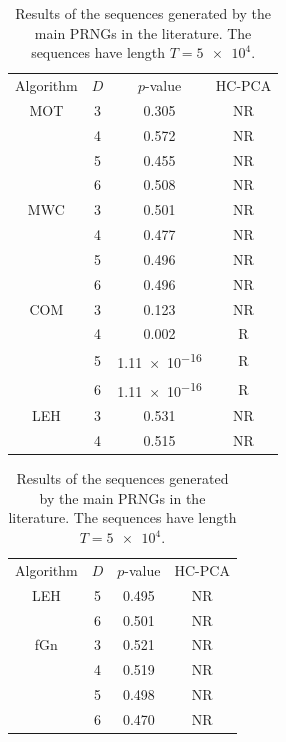 \documentclass[alpha-refs]{wiley-article}
\begin{document}
\begin{table}
	\caption{Results of the sequences generated by the main PRNGs in the literature. 
		The sequences have length $T=\num[scientific-notation = true]{5 e4}$.}
	\label{Tab:LiteratureComparations}
	\centering
	\begin{tabular}{cccc}
		\toprule
		Algorithm & 
		\multicolumn{1}{c}{$D$} & 
		$p$-value &
		HC-PCA\\
		\cmidrule(lr){1-1}
		\cmidrule(lr){2-2}
		\cmidrule(lr){3-3}
		\cmidrule(lr){4-4}
		MOT & 3 & 0.305 & NR\\
		& 4 & 0.572 & NR\\ 
		& 5 & 0.455 & NR\\ 
		& 6 & 0.508 & NR\\ 
		\cmidrule(lr){1-4}
		MWC & 3 & 0.501 & NR\\
		& 4 & 0.477 & NR\\ 
		& 5 & 0.496 & NR\\ 
		& 6 & 0.496 & NR\\ 
		\cmidrule(lr){1-4}
		COM & 3 & 0.123 & NR\\
		& 4 & 0.002 & R\\ 
		& 5 & \num[scientific-notation=true]{1.11 e-16} & R\\ 
		& 6 & \num[scientific-notation=true]{1.11 e-16} & R\\ 
		\cmidrule(lr){1-4}
		LEH & 3 & 0.531 & NR\\
		& 4 & 0.515 & NR\\ 
		\bottomrule
	\end{tabular}
	\begin{tabular}{|cccc}
		\toprule
		Algorithm & 
		\multicolumn{1}{c}{$D$} & 
		$p$-value &
		HC-PCA\\
		\cmidrule(lr){1-1}
		\cmidrule(lr){2-2}
		\cmidrule(lr){3-3}
		\cmidrule(lr){4-4}
		LEH & 5 & 0.495 & NR\\ 
		& 6 & 0.501 & NR\\ 
		\cmidrule(lr){1-4}
		fGn & 3 & 0.521 & NR\\
		& 4 & 0.519 & NR\\ 
		& 5 & 0.498 & NR\\ 
		& 6 & 0.470 & NR\\
		\cmidrule(lr){1-4}

\end{tabular}
\end{table}
\end{document}
